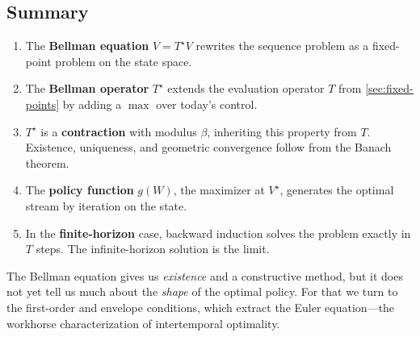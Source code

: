 \subsection{Summary}
\label{subsec:dp-bellman-summary}

\begin{calloutimportant}
\begin{enumerate}[label=(\roman*), leftmargin=2em]
    \item The \textbf{Bellman equation} $V = T^\star V$ rewrites the sequence problem as a fixed-point problem on the state space.
    
    \item The \textbf{Bellman operator} $T^\star$ extends the evaluation operator $T$ from \cref{sec:fixed-points} by adding a $\max$ over today's control.
    
    \item $T^\star$ is a \textbf{contraction} with modulus $\beta$, inheriting this property from $T$. Existence, uniqueness, and geometric convergence follow from the Banach theorem.
    
    \item The \textbf{policy function} $g(W)$, the maximizer at $V^\star$, generates the optimal stream by iteration on the state.
    
    \item In the \textbf{finite-horizon} case, backward induction solves the problem exactly in $T$ steps. The infinite-horizon solution is the limit.
\end{enumerate}
\end{calloutimportant}

The Bellman equation gives us \emph{existence} and a constructive method, but it does not yet tell us much about the \emph{shape} of the optimal policy. For that we turn to the first-order and envelope conditions, which extract the Euler equation---the workhorse characterization of intertemporal optimality.

